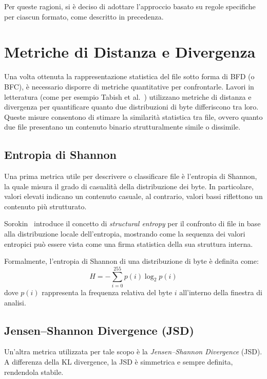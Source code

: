 \documentclass{report}
\begin{document}
\bigskip

Per queste ragioni, si è deciso di adottare l’approccio basato su regole specifiche per ciascun formato,
come descritto in precedenza.


\section{Metriche di Distanza e Divergenza}

Una volta ottenuta la rappresentazione statistica del file sotto forma di BFD (o BFC), è necessario disporre di metriche quantitative per confrontarle.
Lavori in letteratura (come per esempio Tabish et al.~\cite{tabish2009malware}) utilizzano metriche di distanza e divergenza per quantificare quanto due distribuzioni di byte differiscono tra loro.
Queste misure consentono di stimare la similarità statistica tra file, ovvero quanto due file presentano un contenuto binario strutturalmente simile o dissimile.

\subsection{Entropia di Shannon}

Una prima metrica utile per descrivere o classificare file è l’entropia di Shannon, la quale misura il grado di casualità della distribuzione dei byte.
In particolare, valori elevati indicano un contenuto casuale, al contrario, valori bassi riflettono un contenuto più strutturato.

Sorokin~\cite{sorokin2011entropy} introduce il concetto di \emph{structural entropy} per il confronto di file in base alla distribuzione locale dell’entropia, mostrando come la sequenza dei valori entropici può essere vista come una firma statistica della sua struttura interna.

Formalmente, l’entropia di Shannon di una distribuzione di byte è definita come:
\[
H = - \sum_{i=0}^{255} p(i) \log_2 p(i)
\]
dove $p(i)$ rappresenta la frequenza relativa del byte $i$ all’interno della finestra di analisi.

\subsection{Jensen–Shannon Divergence (JSD)}

Un’altra metrica utilizzata per tale scopo è la \emph{Jensen–Shannon Divergence} (JSD).
A differenza della KL divergence, la JSD è simmetrica e sempre definita, rendendola stabile.
\end{document}

